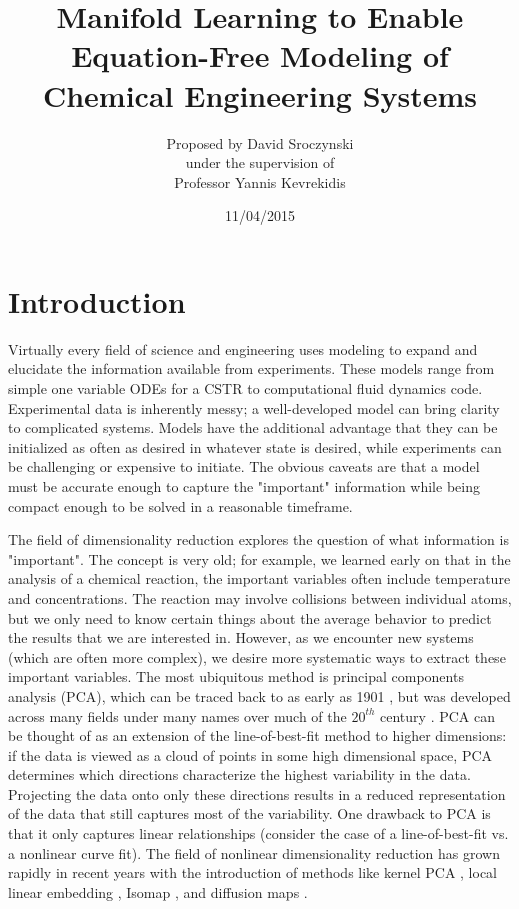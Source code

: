 \documentclass[12pt]{article}
\begin{document}
\title{Manifold Learning to Enable Equation-Free Modeling of Chemical Engineering Systems}
\author{\LARGE Proposed by David Sroczynski\vspace{3mm}\\\Large under the supervision of\vspace{3mm}\\\LARGE Professor Yannis Kevrekidis}
\date{11/04/2015}
\maketitle
\thispagestyle{empty}
\clearpage
\tableofcontents
\thispagestyle{empty}
\clearpage
{}
\section{Introduction}
Virtually every field of science and engineering uses modeling to expand and elucidate the information available from experiments. These models range from simple one variable ODEs for a CSTR to computational fluid dynamics code. Experimental data is inherently messy; a well-developed model can bring clarity to complicated systems. Models have the additional advantage that they can be initialized as often as desired in whatever state is desired, while experiments can be challenging or expensive to initiate. The obvious caveats are that a model must be accurate enough to capture the "important" information while being compact enough to be solved in a reasonable timeframe.  \vspace{1mm}

The field of dimensionality reduction explores the question of what information is "important". The concept is very old; for example, we learned early on that in the analysis of a chemical reaction, the important variables often include temperature and concentrations. The reaction may involve collisions between individual atoms, but we only need to know certain things about the average behavior to predict the results that we are interested in. However, as we encounter new systems (which are often more complex), we desire more systematic ways to extract these important variables. The most ubiquitous method is principal components analysis (PCA), which can be traced back to as early as 1901 \cite{Pearson1901}, but was developed across many fields under many names over much of the $20^{th}$ century \cite{Hotelling1933}. PCA can be thought of as an extension of the line-of-best-fit method to higher dimensions: if the data is viewed as a cloud of points in some high dimensional space, PCA determines which directions characterize the highest variability in the data. Projecting the data onto only these directions results in a reduced representation of the data that still captures most of the variability. One drawback to PCA is that it only captures linear relationships (consider the case of a line-of-best-fit vs. a nonlinear curve fit). The field of nonlinear dimensionality reduction has grown rapidly in recent years with the introduction of methods like kernel PCA \cite{Scholkopf1998}, local linear embedding \cite{Roweis2000}, Isomap \cite{Tenenbaum2000}, and diffusion maps \cite{Coifman2005} \cite{Coifman2005a} \cite{Coifman2006}.  \vspace{1mm}
\end{document}
